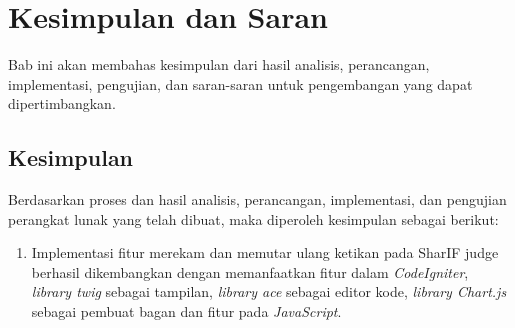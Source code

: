 \chapter{Kesimpulan dan Saran}
\label{chap:kesimpulandansaran}

Bab ini akan membahas kesimpulan dari hasil analisis, perancangan, implementasi, pengujian, dan saran-saran untuk pengembangan yang dapat dipertimbangkan.

\section{Kesimpulan}
Berdasarkan proses dan hasil analisis, perancangan, implementasi, dan pengujian perangkat lunak yang telah dibuat, maka diperoleh kesimpulan sebagai berikut:

\begin{enumerate}
	\item Implementasi fitur merekam dan memutar ulang ketikan pada SharIF judge berhasil dikembangkan dengan memanfaatkan fitur dalam \textit{CodeIgniter}, \textit{library twig} sebagai tampilan, \textit{library ace} sebagai editor kode, \textit{library Chart.js} sebagai pembuat bagan dan fitur pada \textit{JavaScript}.
	

\end{enumerate}
